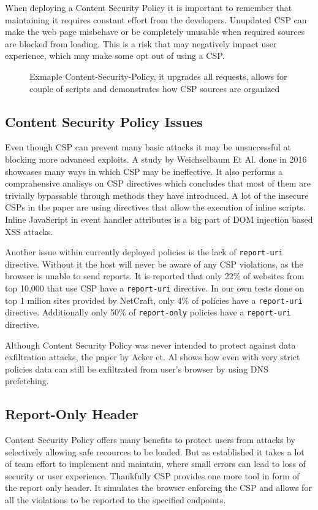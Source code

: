 When deploying a Content Security Policy it is important to remember that maintaining it requires constant effort from the developers.
Unupdated CSP can make the web page misbehave or be completely unusable when required sources are blocked from loading.
This is a risk that may negatively impact user experience, which may make some opt out of using a CSP.

\begin{figure}[H]
	
	\caption{Exmaple Content-Security-Policy, it upgrades all requests, allows for couple of scripts and demonstrates how CSP sources are organized}
\end{figure}


\subsection{Content Security Policy Issues}
Even though CSP can prevent many basic attacks it may be unsuccessful at blocking more advanced exploits.
A study by Weichselbaum Et Al. done in 2016 showcases many ways in which CSP may be ineffective. \cite{weichselbaum2016csp}
It also performs a comprahensive analisys on CSP directives which concludes that most of them are trivially bypassable through methods they have introduced.
A lot of the insecure CSPs in the paper are using directives that allow the execution of inline scripts.
Inline JavaScript in event handler attributes is a big part of DOM injection based XSS attacks.

Another issue within currently deployed policies is the lack of \texttt{report-uri} directive.
Without it the host will never be aware of any CSP violations, as the browser is unable to send reports.
It is reported that only 22\% of websites from top 10,000 that use CSP have a \texttt{report-uri} directive.
In our own tests done on top 1 milion sites provided by NetCraft, only 4\% of policies have a \texttt{report-uri} directive.
Additionally only 50\% of \texttt{report-only} policies have a \texttt{report-uri} directive.

Although Content Security Policy was never intended to protect against data exfiltration attacks, 
the paper by Acker et. Al shows how even with very strict policies data can still be exfiltrated from user's browser by using DNS prefetching.


\subsection{Report-Only Header}
Content Security Policy offers many benefits to protect users from attacks by selectively allowing safe recources to be loaded.
But as established it takes a lot of team effort to implement and maintain, where small errors can lead to loss of security or user experience.
Thankfully CSP provides one more tool in form of the report only header.
It simulates the browser enforcing the CSP and allows for all the violations to be reported to the specified endpoints.

